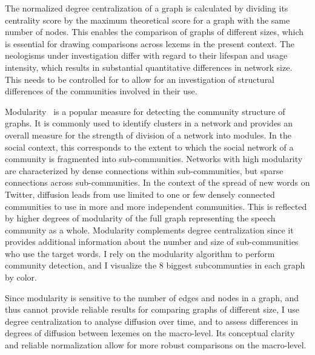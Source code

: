 \documentclass[
  a4paper,
  abstract=on,
  captions=tableabove
  ]{scrartcl}
\begin{document}
  The normalized degree centralization of a graph is calculated by dividing its centrality score by the maximum theoretical score for a graph with the same number of nodes. This enables the comparison of graphs of different sizes, which is essential for drawing comparisons across lexems in the present context. The neologisms under investigation differ with regard to their lifespan and usage intensity, which results in substantial quantitative differences in network size. This needs to be controlled for to allow for an investigation of structural differences of the communities involved in their use.

  Modularity~\parencite{Blondel2008FastUnfolding} is a popular measure for detecting the community structure of graphs. It is commonly used to identify clusters in a network and provides an overall measure for the strength of division of a network into modules. In the social context, this corresponds to the extent to which the social network of a community is fragmented into sub-communities. Networks with high modularity are characterized by dense connections within sub-communities, but sparse connections across sub-communities. In the context of the spread of new words on Twitter, diffusion leads from use limited to one or few densely connected communities to use in more and more independent communities. This is reflected by higher degrees of modularity of the full graph representing the speech community as a whole. Modularity complements degree centralization since it provides additional information about the number and size of sub-communities who use the target words. I rely on the modularity algorithm to perform community detection, and I visualize the 8 biggest subcommunties in each graph by color.

  Since modularity is sensitive to the number of edges and nodes in a graph, and thus cannot provide reliable results for comparing graphs of different size, I use degree centralization to analyse diffusion over time, and to assess differences in degrees of diffusion between lexemes on the macro-level. Its conceptual clarity and reliable normalization allow for more robust comparisons on the macro-level.
\end{document}
